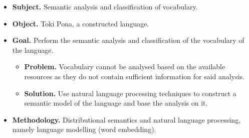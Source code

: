 \documentclass[14pt, a4paper]{extreport}
\begin{document}




\begin{itemize}
  \item \textbf{Subject.} Semantic analysis and classification of vocabulary.
  \item \textbf{Object.} Toki Pona, a constructed language.
  \item \textbf{Goal.} Perform the semantic analysis and classification of the vocabulary of the language.
  \begin{itemize}
    \item \textbf{Problem.} Vocabulary cannot be analysed based on the available resources as they do not contain sufficient information for said analysis.
    \item \textbf{Solution.} Use natural language processing techniques to construct a semantic model of the language and base the analysis on it.
  \end{itemize}
  \item \textbf{Methodology.} Distributional semantics and natural language processing, namely language modelling (word embedding).
\end{itemize}
\end{document}
